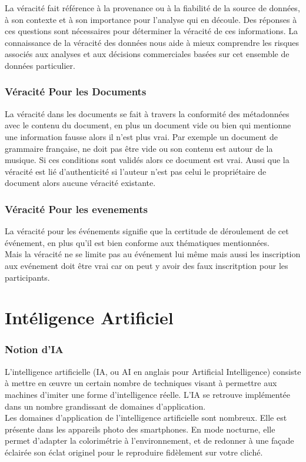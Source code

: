 \documentclass[12pt]{report}
\begin{document}
La véracité fait référence à la provenance ou à la fiabilité de la source de données, à son contexte et à son importance pour l'analyse qui en découle. Des réponses à ces questions sont nécessaires pour déterminer la véracité de ces informations. La connaissance de la véracité des données nous aide à mieux comprendre les risques associés aux analyses et aux décisions commerciales basées sur cet ensemble de données particulier.
\subsubsection{Véracité Pour les Documents}
La véracité dans les documents se fait à travers la 
conformité des métadonnées avec le contenu du document, 
en plus un document vide ou bien qui mentionne une information 
fausse alors il n'est plus vrai.
Par exemple un document de grammaire 
française, ne doit pas être vide ou son contenu est 
autour de la musique. Si ces conditions sont validés alors ce 
document est vrai. 
Aussi que la véracité est lié d'authenticité si l'auteur 
n'est pas celui le propriétaire de document alors aucune 
véracité existante.
\subsubsection{Véracité Pour les evenements}

La véracité pour les événements signifie que la certitude de 
déroulement de cet événement, en plus qu'il est bien conforme 
aux thématiques mentionnées. \\Mais la véracité ne se limite pas au
 événement lui même mais aussi les inscription aux evénement 
doit être vrai car on peut y avoir des faux inscritption pour 
les participants.
\section{Intéligence Artificiel}
\subsubsection{Notion d'IA}

L'intelligence artificielle (IA, ou AI en anglais pour Artificial Intelligence) consiste à mettre en œuvre un certain nombre de techniques visant à permettre aux machines d'imiter une forme d'intelligence réelle. L'IA se retrouve implémentée dans un nombre grandissant de domaines d'application.\\
Les domaines d'application de l'intelligence artificielle sont nombreux. Elle est présente dans les appareils photo des smartphones. En mode nocturne, elle permet d'adapter la colorimétrie à l'environnement, et de redonner à une façade éclairée son éclat originel pour le reproduire fidèlement sur votre cliché\cite{37}.\\
\end{document}
